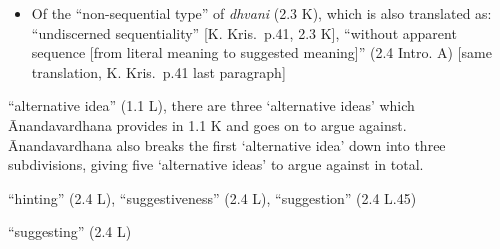 \documentclass[10pt]{article}
\begin{document}
\begin{multicols}{2}
\begin{enumerate}[
			leftmargin=0em,
			rightmargin=0em,
		]
\begin{enumerate}
\begin{itemize}
				\item Of the ``non-sequential type'' of \textit{dhvani} (2.3 K),
				      which is also translated as:
				      ``undiscerned sequentiality'' [K. Kris.\ p.41, 2.3 K],
				      ``without apparent sequence [from literal meaning to suggested meaning]'' (2.4 Intro. A)
				      [same translation, K. Kris.\ p.41 last paragraph]
			\end{itemize}

		\end{enumerate}



		 ``alternative idea'' (1.1 L),
		there are three `alternative ideas' which Ānandavardhana provides in 1.1 K and goes on to argue against.
		Ānandavardhana also breaks the first `alternative idea' down into three subdivisions, giving five `alternative ideas' to argue against in total.

		 ``hinting'' (2.4 L),
		``suggestiveness'' (2.4 L),
		``suggestion'' (2.4 L.45)

		 ``suggesting'' (2.4 L)




\end{enumerate}
\end{multicols}
\end{document}
